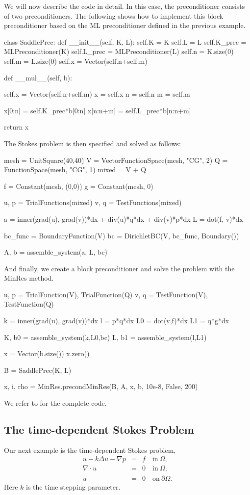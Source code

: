 We will now describe the code in detail. 
In this case, the preconditioner consists of two preconditioners.
The following shows how to implement this block preconditioner
based on the ML preconditioner defined in the previous example.
\begin{code}
class SaddlePrec: 
    def __init__(self, K, L):  
        self.K = K
        self.L = L
        self.K_prec = MLPreconditioner(K)
        self.L_prec = MLPreconditioner(L)
        self.n = K.size(0)
        self.m = L.size(0)
        self.x = Vector(self.n+self.m)

    def __mul__(self, b):

        self.x = Vector(self.n+self.m)
        x = self.x 
        n = self.n
        m = self.m

        x[0:n]    = self.K_prec*b[0:n]
        x[n:n+m]  = self.L_prec*b[n:n+m] 

        return x 
\end{code}
The Stokes problem is then specified and solved as follows: 
\begin{code}
mesh = UnitSquare(40,40)
V = VectorFunctionSpace(mesh, "CG", 2)
Q = FunctionSpace(mesh, "CG", 1)
mixed = V + Q 

f = Constant(mesh, (0,0))
g = Constant(mesh, 0)

u, p = TrialFunctions(mixed) 
v, q = TestFunctions(mixed)

a = inner(grad(u), grad(v))*dx + div(u)*q*dx + div(v)*p*dx  
L = dot(f, v)*dx 

bc_func = BoundaryFunction(V)
bc = DirichletBC(V, bc_func, Boundary()) 

A, b = assemble_system(a, L, bc)
\end{code}
And finally, we create a block preconditioner and solve the problem with 
the MinRes method.
\begin{code}
u, p = TrialFunction(V), TrialFunction(Q)
v, q = TestFunction(V), TestFunction(Q)

k = inner(grad(u), grad(v))*dx 
l = p*q*dx 
L0 = dot(v,f)*dx 
L1 = q*g*dx 

K, b0 = assemble_system(k,L0,bc)
L, b1 = assemble_system(l,L1)

x = Vector(b.size())
x.zero()

B = SaddlePrec(K, L)

x, i, rho  = MinRes.precondMinRes(B, A, x, b, 10e-8, False, 200)
\end{code}
We refer to  for the complete code. 

\subsection{The time-dependent Stokes Problem}
Our next example is the time-dependent Stokes problem,
\begin{eqnarray}
u - k \Delta u - \nabla p &=& f \quad \mbox{in} \ \Omega, \\ 
\nabla \cdot u &=& 0 \quad \mbox{in} \  \Omega, \\
             u &=& 0   \quad \mbox{on} \  \partial \Omega.  
\end{eqnarray}
Here $k$ is the time stepping parameter. 

